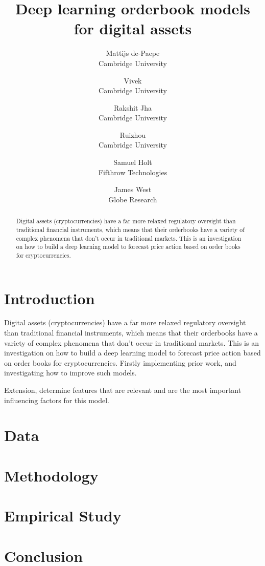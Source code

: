 \documentclass[11pt,a4paper,english]{article}
\title{Deep learning orderbook models for digital assets}
\author{%
    Mattijs de-Paepe \\
    \small Cambridge University\\
    \and
    Vivek \\
    \small Cambridge University\\
    \and
    Rakshit Jha \\
    \small Cambridge University\\
    \and
    Ruizhou \\
    \small Cambridge University\\
    \and
    Samuel Holt \\
    \small Fifthrow Technologies\\
    \and
    James West\\
    \small Globe Research\\
}
\begin{document}
    \maketitle

    \begin{abstract}
    Digital assets (cryptocurrencies) have a far more relaxed regulatory oversight than traditional financial instruments, which means that their orderbooks have a variety of complex phenomena that don’t occur in traditional markets. This is an investigation on how to build a deep learning model to forecast price action based on order books for cryptocurrencies.
    \end{abstract}
    \newpage

    \tableofcontents\newpage
    \section{Introduction}
    Digital assets (cryptocurrencies) have a far more relaxed regulatory oversight than traditional financial instruments, which means that their orderbooks have a variety of complex phenomena that don’t occur in traditional markets.
    This is an investigation on how to build a deep learning model to forecast price action based on order books for cryptocurrencies.
    Firstly implementing prior work, and investigating how to improve such models.


    Extension, determine features that are relevant and are the most important influencing factors for this model.
    \section{Data}
    \section{Methodology}
    \section{Empirical Study}
    \section{Conclusion}
\end{document}
